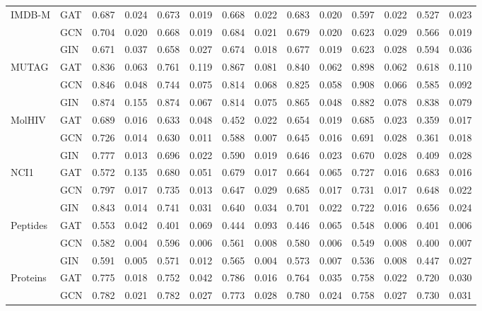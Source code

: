\begin{tabular}{llrrrrrrrrrrrr}
\cline{1-14}
\multirow[t]{3}{*}{IMDB-M} & GAT & 0.687 & 0.024 & 0.673 & 0.019 & 0.668 & 0.022 & 0.683 & 0.020 & 0.597 & 0.022 & 0.527 & 0.023 \\
 & GCN & 0.704 & 0.020 & 0.668 & 0.019 & 0.684 & 0.021 & 0.679 & 0.020 & 0.623 & 0.029 & 0.566 & 0.019 \\
 & GIN & 0.671 & 0.037 & 0.658 & 0.027 & 0.674 & 0.018 & 0.677 & 0.019 & 0.623 & 0.028 & 0.594 & 0.036 \\
\cline{1-14}
\multirow[t]{3}{*}{MUTAG} & GAT & 0.836 & 0.063 & 0.761 & 0.119 & 0.867 & 0.081 & 0.840 & 0.062 & 0.898 & 0.062 & 0.618 & 0.110 \\
 & GCN & 0.846 & 0.048 & 0.744 & 0.075 & 0.814 & 0.068 & 0.825 & 0.058 & 0.908 & 0.066 & 0.585 & 0.092 \\
 & GIN & 0.874 & 0.155 & 0.874 & 0.067 & 0.814 & 0.075 & 0.865 & 0.048 & 0.882 & 0.078 & 0.838 & 0.079 \\
\cline{1-14}
\multirow[t]{3}{*}{MolHIV} & GAT & 0.689 & 0.016 & 0.633 & 0.048 & 0.452 & 0.022 & 0.654 & 0.019 & 0.685 & 0.023 & 0.359 & 0.017 \\
 & GCN & 0.726 & 0.014 & 0.630 & 0.011 & 0.588 & 0.007 & 0.645 & 0.016 & 0.691 & 0.028 & 0.361 & 0.018 \\
 & GIN & 0.777 & 0.013 & 0.696 & 0.022 & 0.590 & 0.019 & 0.646 & 0.023 & 0.670 & 0.028 & 0.409 & 0.028 \\
\cline{1-14}
\multirow[t]{3}{*}{NCI1} & GAT & 0.572 & 0.135 & 0.680 & 0.051 & 0.679 & 0.017 & 0.664 & 0.065 & 0.727 & 0.016 & 0.683 & 0.016 \\
 & GCN & 0.797 & 0.017 & 0.735 & 0.013 & 0.647 & 0.029 & 0.685 & 0.017 & 0.731 & 0.017 & 0.648 & 0.022 \\
 & GIN & 0.843 & 0.014 & 0.741 & 0.031 & 0.640 & 0.034 & 0.701 & 0.022 & 0.722 & 0.016 & 0.656 & 0.024 \\
\cline{1-14}
\multirow[t]{3}{*}{Peptides} & GAT & 0.553 & 0.042 & 0.401 & 0.069 & 0.444 & 0.093 & 0.446 & 0.065 & 0.548 & 0.006 & 0.401 & 0.006 \\
 & GCN & 0.582 & 0.004 & 0.596 & 0.006 & 0.561 & 0.008 & 0.580 & 0.006 & 0.549 & 0.008 & 0.400 & 0.007 \\
 & GIN & 0.591 & 0.005 & 0.571 & 0.012 & 0.565 & 0.004 & 0.573 & 0.007 & 0.536 & 0.008 & 0.447 & 0.027 \\
\cline{1-14}
\multirow[t]{3}{*}{Proteins} & GAT & 0.775 & 0.018 & 0.752 & 0.042 & 0.786 & 0.016 & 0.764 & 0.035 & 0.758 & 0.022 & 0.720 & 0.030 \\
 & GCN & 0.782 & 0.021 & 0.782 & 0.027 & 0.773 & 0.028 & 0.780 & 0.024 & 0.758 & 0.027 & 0.730 & 0.031 \\

\end{tabular}
